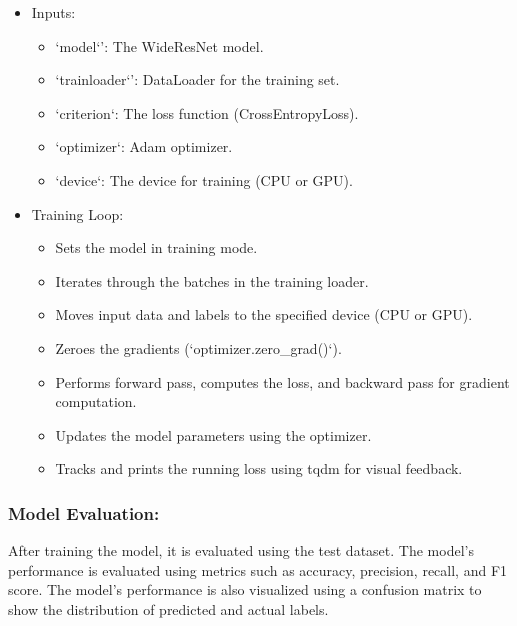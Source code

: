 \documentclass[twocolumn]{article}
\begin{document}
        \begin{itemize}
            \item Inputs:
            \begin{itemize}
                \item `model`': The WideResNet model.
                \item `trainloader`': DataLoader for the training set.
                \item `criterion`: The loss function (CrossEntropyLoss).
                \item `optimizer`: Adam optimizer.
                \item `device`: The device for training (CPU or GPU).
            \end{itemize} 
            \item Training Loop:
            \begin{itemize}
                \item Sets the model in training mode.
                \item Iterates through the batches in the training loader.
                \item Moves input data and labels to the specified device (CPU or GPU).
                \item Zeroes the gradients (`optimizer.zero\_grad()`).
                \item Performs forward pass, computes the loss, and backward pass for gradient computation.
                \item Updates the model parameters using the optimizer.
                \item Tracks and prints the running loss using tqdm for visual feedback.
            \end{itemize}
        \end{itemize}

    \subsubsection{Model Evaluation:} 
        
        After training the model, it is evaluated using the test dataset. The model's performance is evaluated using metrics such as accuracy, precision, recall, and F1 score. The model's performance is also visualized using a confusion matrix to show the distribution of predicted and actual labels.
\end{document}

